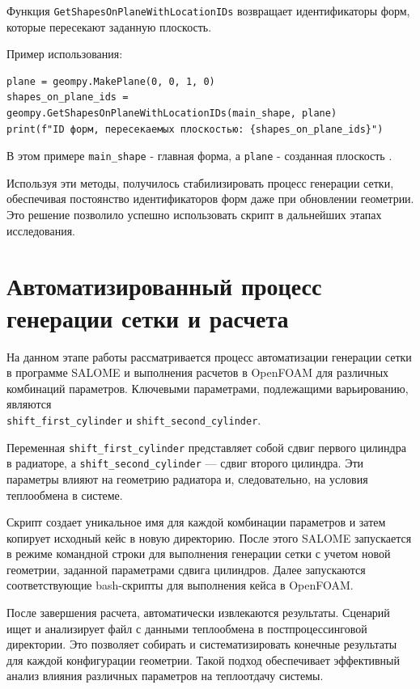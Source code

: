 \documentclass[a4paper,12pt]{article}
\theoremstyle{plain} %
\theoremstyle{definition} %
\theoremstyle{remark} %
\begin{document}
Функция \texttt{GetShapesOnPlaneWithLocationIDs} возвращает идентификаторы форм, которые пересекают заданную плоскость.

Пример использования:
\begin{verbatim}
plane = geompy.MakePlane(0, 0, 1, 0)
shapes_on_plane_ids = geompy.GetShapesOnPlaneWithLocationIDs(main_shape, plane)
print(f"ID форм, пересекаемых плоскостью: {shapes_on_plane_ids}")
\end{verbatim}

В этом примере \texttt{main\_shape} - главная форма, а \texttt{plane} - созданная плоскость \cite{salome_doc}.

Используя эти методы, получилось стабилизировать процесс генерации сетки, обеспечивая постоянство идентификаторов форм даже при обновлении геометрии. Это решение позволило успешно использовать скрипт в дальнейших этапах исследования.

\section{Автоматизированный процесс генерации сетки и расчета}

На данном этапе работы рассматривается процесс автоматизации генерации сетки в программе SALOME и выполнения расчетов в OpenFOAM для различных комбинаций параметров. Ключевыми параметрами, подлежащими варьированию, являются \\ \texttt{shift\_first\_cylinder} и \texttt{shift\_second\_cylinder}.

Переменная \texttt{shift\_first\_cylinder} представляет собой сдвиг первого цилиндра в радиаторе, а \texttt{shift\_second\_cylinder} — сдвиг второго цилиндра. Эти параметры влияют на геометрию радиатора и, следовательно, на условия теплообмена в системе.

Скрипт создает уникальное имя для каждой комбинации параметров и затем копирует исходный кейс в новую директорию. После этого SALOME запускается в режиме командной строки для выполнения генерации сетки с учетом новой геометрии, заданной параметрами сдвига цилиндров. Далее запускаются соответствующие bash-скрипты для выполнения кейса в OpenFOAM.

После завершения расчета, автоматически извлекаются результаты. Сценарий ищет и анализирует файл с данными теплообмена в постпроцессинговой директории. Это позволяет собирать и систематизировать конечные результаты для каждой конфигурации геометрии. Такой подход обеспечивает эффективный анализ влияния различных параметров на теплоотдачу системы.
\end{document}
